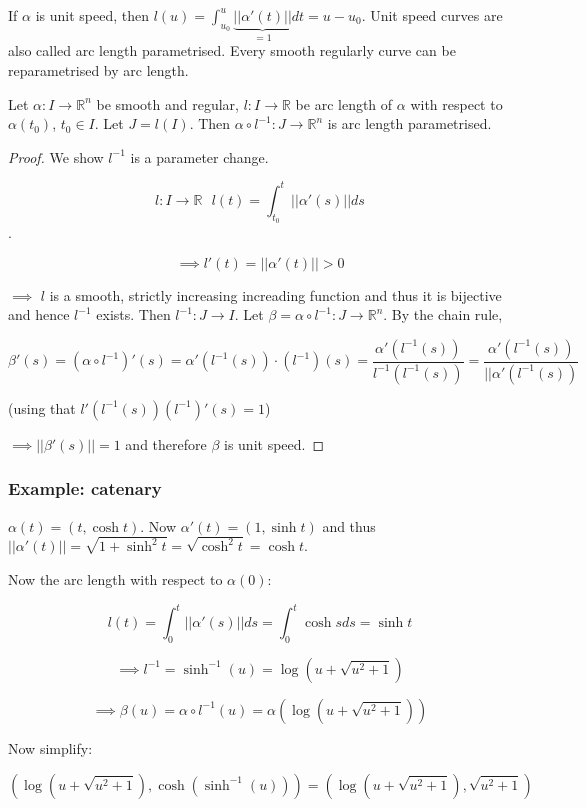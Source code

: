 If $\alpha$ is unit speed, then $l(u) = \int_{u_0}^u \underbrace{|| \alpha ' (t) ||}_{=1} dt = u - u_0$. Unit speed curves are also called arc length parametrised. Every smooth regularly curve can be reparametrised by arc length.

\vspace{\baselineskip}

Let $\alpha : I \rightarrow \mathbb{R}^n$ be smooth and regular, $l : I \rightarrow \mathbb{R}$ be arc length of $\alpha$ with respect to $\alpha(t_0)$, $t_0 \in I$. Let $J = l(I)$. Then $\alpha \circ l^{-1} : J \rightarrow \mathbb{R}^n$ is arc length parametrised.

\begin{proof}

We show $l^{-1}$ is a parameter change.

$$l : I \rightarrow \mathbb{R} \, \, \, \, l(t) = \int_{t_0}^t || \alpha ' (s) || ds$$.

$$\implies l' (t) = || \alpha ' (t) || > 0$$

$\implies$ $l$ is a smooth, strictly increasing increading function and thus it is bijective and hence $l^{-1}$ exists. Then $l^{-1} : J \rightarrow I$. Let $\beta = \alpha \circ l^{-1} : J \rightarrow \mathbb{R}^n$. By the chain rule, 

$$\beta ' (s) = (\alpha \circ l^{-1})' (s) = \alpha ' (l^{-1} (s)) \cdot (l^{-1})(s) = \frac{\alpha ' (l^{-1} (s))}{l^{-1} (l^{-1} (s))} = \frac{\alpha ' (l^{-1} (s))}{||\alpha ' (l^{-1} (s))}$$

(using that $l' (l^{-1} (s)) (l^{-1})' (s) = 1$)

$\implies || \beta ' (s) || = 1$ and therefore $\beta$ is unit speed.

\end{proof}

\subsubsection*{Example: catenary}

$\alpha (t) = (t, \cosh t)$. Now $\alpha ' (t) = (1, \sinh t)$ and thus $|| \alpha ' (t) || = \sqrt{1+\sinh^2 t} = \sqrt{\cosh^2 t} = \cosh t$.

Now the arc length with respect to $\alpha (0)$:

$$l(t) = \int_0^t || \alpha ' (s) || ds = \int_0^t \cosh s ds = \sinh t$$

$$\implies l^{-1} = \sinh^{-1} (u) = \log (u + \sqrt{u^2 + 1})$$

$$\implies \beta (u) = \alpha \circ l^{-1} (u) = \alpha (\log (u + \sqrt{u^2 + 1}))$$

Now simplify:

$$(\log (u + \sqrt{u^2 + 1}), \cosh (\sinh^{-1} (u))) = (\log (u + \sqrt{u^2 + 1}), \sqrt{u^2 + 1})$$